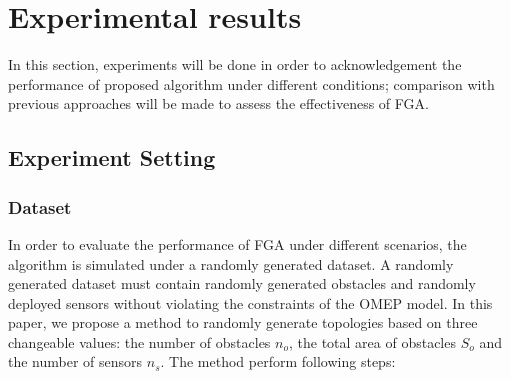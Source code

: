\documentclass[final]{elsarticle}
\begin{document}
\section{Experimental results}
In this section, experiments will be done in order to acknowledgement the performance of proposed algorithm under different conditions; comparison with previous approaches will be made to assess the effectiveness of FGA. 
\subsection{Experiment Setting}
\subsubsection{Dataset}
In order to evaluate the performance of FGA under different scenarios, the algorithm is simulated under a randomly generated dataset. A randomly generated dataset must contain randomly generated obstacles and randomly deployed sensors without violating the constraints of the OMEP model. In this paper, we propose a method to randomly generate topologies based on three changeable values: the number of obstacles $n_o$, the total area of obstacles $S_o$ and the number of sensors $n_s$. The method perform following steps: 
\end{document}
